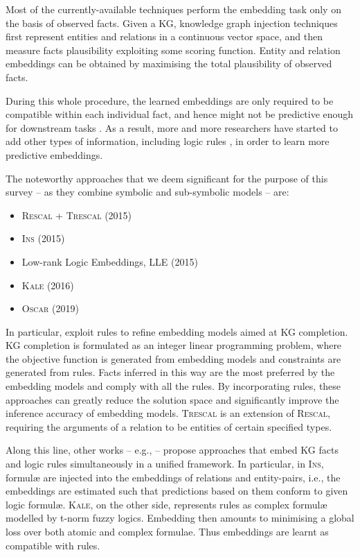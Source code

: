 \documentclass[12pt,a4paper,openright,twoside]{book}
\begin{document}
Most of the currently-available techniques perform the embedding task only on the basis of observed facts.
%
Given a KG, knowledge graph injection techniques first represent entities and relations in a continuous vector space, and then measure facts plausibility exploiting some scoring function.
%
Entity and relation embeddings can be obtained by maximising the total plausibility of observed facts.

During this whole procedure, the learned embeddings are only required to be compatible within each individual fact, and hence might not be predictive enough for downstream tasks \cite{wang2015,wei2015}.
%
As a result, more and more researchers have started to add other types of information, including logic rules \cite{wang2015,rocktaschel2015,guo2016}, in order to learn more predictive embeddings.

The noteworthy approaches that we deem significant for the purpose of this survey -- as they combine symbolic and sub-symbolic models -- are:
%
\begin{itemize}
	\item \textsc{Rescal} + \textsc{Trescal} (2015) \cite{wang2015}
	\item \textsc{Ins} (2015) \cite{wei2015}
	\item Low-rank Logic Embeddings, LLE (2015) \cite{rocktaschel2015}
	\item \textsc{Kale} (2016) \cite{guo2016}
	\item \textsc{Oscar} (2019) \cite{goodwin2019}
\end{itemize}
%
In particular, \cite{wang2015,wei2015} exploit rules to refine embedding models aimed at KG completion.
%
KG completion is formulated as an integer linear programming problem, where the objective function is generated from embedding models and constraints are generated from rules.
%
Facts inferred in this way are the most preferred by the embedding models and comply with all the rules.
%
By incorporating rules, these approaches can greatly reduce the solution space and significantly improve the inference accuracy of embedding models.
%
\textsc{Trescal} \cite{wang2015} is an extension of \textsc{Rescal}, requiring the arguments of a relation to be entities of certain specified types.

Along this line, other works -- e.g., \cite{rocktaschel2015,guo2016} -- propose approaches that embed KG facts and logic rules simultaneously in a unified framework.
%
In particular, in \textsc{Ins}, formul\ae{} are injected into the embeddings of relations and entity-pairs, i.e., the embeddings are estimated such that predictions based on them conform to given logic formul\ae.
%
\textsc{Kale}, on the other side, represents rules as complex formul\ae{} modelled by t-norm fuzzy logics.
%
Embedding then amounts to minimising a global loss over both atomic and complex formulae.
%
Thus embeddings are learnt as compatible with rules.
\end{document}
